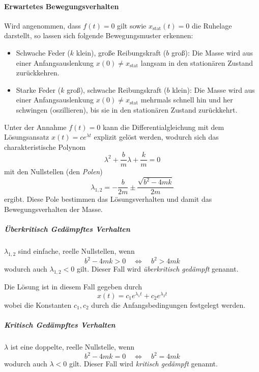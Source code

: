 			\paragraph{Erwartetes Bewegungsverhalten}
				Wird angenommen, dass \( f(t) = 0 \) gilt sowie \( x_\text{stat}(t) = 0 \) die Ruhelage darstellt, so lassen sich folgende Bewegungsmuster erkennen:
				\begin{itemize}
					\item Schwache Feder (\(k\) klein), große Reibungskraft (\(b\) groß): Die Masse wird aus einer Anfangsauslenkung \( x(0) \neq x_\text{stat} \) langsam in den stationären Zustand zurückkehren.
					\item Starke Feder (\(k\) groß), schwache Reibungskraft (\(b\) klein): Die Masse wird aus einer Anfangsauslenkung \( x(0) \neq x_\text{stat} \) mehrmals schnell hin und her schwingen (oszillieren), bis sie in den stationären Zustand zurückkehrt.
				\end{itemize}

				Unter der Annahme \( f(t) = 0 \) kann die Differentialgleichung mit dem Lösungsansatz \( x(t) = ce^{\lambda t} \) explizit gelöst werden, wodurch sich das charakteristische Polynom
				\begin{equation*}
					\lambda^2 + \frac{b}{m} \lambda + \frac{k}{m} = 0
				\end{equation*}
				mit den Nullstellen (den \emph{Polen})
				\begin{equation*}
					\lambda_{1, 2} = -\frac{b}{2m} \pm \frac{\sqrt{b^2 - 4mk}}{2m}
				\end{equation*}
				ergibt. Diese Pole bestimmen das Lösungsverhalten und damit das Bewegungsverhalten der Masse.

				\subparagraph{Überkritisch Gedämpftes Verhalten}
					\( \lambda_{1, 2} \) sind einfache, reelle Nullstellen, wenn
					\begin{equation*}
						b^2 - 4mk > 0 \quad\iff\quad b^2 > 4mk
					\end{equation*}
					wodurch auch \( \lambda_{1, 2} < 0 \) gilt. Dieser Fall wird \emph{überkritisch gedämpft} genannt.

					Die Lösung ist in diesem Fall gegeben durch
					\begin{equation*}
						x(t) = c_1 e^{\lambda_1 t} + c_2 e^{\lambda_2 t}
					\end{equation*}
					wobei die Konstanten \( c_1, c_2 \) durch die Anfangsbedingungen festgelegt werden.

				\subparagraph{Kritisch Gedämpftes Verhalten}
					\( \lambda \) ist eine doppelte, reelle Nullstelle, wenn
					\begin{equation*}
						b^2 - 4mk = 0 \quad\iff\quad b^2 = 4mk
					\end{equation*}
					wodurch auch \( \lambda < 0 \) gilt. Dieser Fall wird \emph{kritisch gedämpft} genannt.

